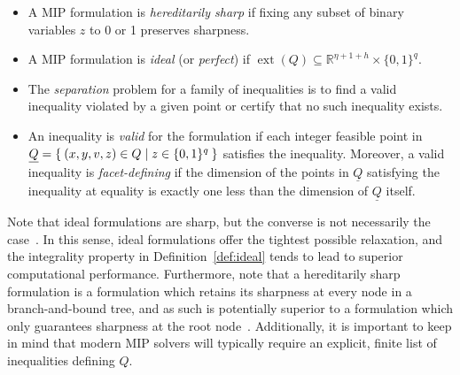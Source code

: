 \documentclass[smallextended]{svjour3}
\newcommand{\blue}[1]{{#1}}
\newcommand{\bbR}{\mathbb{R}}
\newcommand{\Conv}{\operatorname{Conv}}
\newcommand{\ext}{\operatorname{ext}}
\newcommand{\Proj}{\operatorname{Proj}}
\newcommand{\ubar}[1]{\underline{#1}}
\begin{document}
\begin{definition}
\begin{itemize}
        \item A MIP formulation is \emph{hereditarily sharp} if fixing any subset of binary variables $z$ to 0 or 1 preserves sharpness.%
        \item A MIP formulation is \emph{ideal} (or \emph{perfect}) if $\ext(Q) \subseteq \bbR^{\eta + 1 + \blue{h}} \times \{0,1\}^q$.
        \item The \emph{separation} problem for a family of inequalities is to find a valid inequality violated by a given point or certify that no such inequality exists.
        \item An inequality is \emph{valid} for the formulation if each integer feasible point in $\ubar{Q} = \Set{(x,y,v,z) \in Q | z \in \{0,1\}^q}$ satisfies the inequality. Moreover, a valid inequality is \emph{facet-defining} if the dimension of the points in $\ubar{Q}$ satisfying the inequality at equality is exactly one less than the dimension of $\ubar{Q}$ itself.
    \end{itemize}
\end{definition}

Note that ideal formulations are sharp, but the converse is not necessarily the case~\cite[Proposition 2.4]{Vielma:2015}.  In this sense, ideal formulations offer the tightest possible relaxation, and the integrality property in Definition~\ref{def:ideal} tends to lead to superior computational performance. Furthermore, note that a hereditarily sharp formulation is a formulation which retains its sharpness at every node in a branch-and-bound tree, and as such is potentially superior to a formulation which only guarantees sharpness at the root node~\cite{Jeroslow:1984,Jeroslow:1988c}. Additionally, it is important to keep in mind that modern MIP solvers will typically require an explicit, finite list of inequalities defining $Q$.
\end{document}
